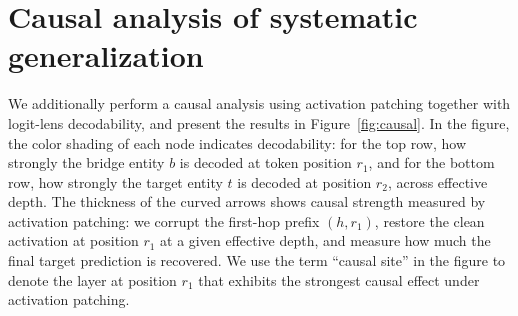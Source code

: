 
\section{Causal analysis of systematic generalization}
\label{app:causal}

We additionally perform a causal analysis using activation patching together with logit-lens decodability, and present the results in Figure~\ref{fig:causal}. In the figure, the color shading of each node indicates decodability: for the top row, how strongly the bridge entity $b$ is decoded at token position $r_1$, and for the bottom row, how strongly the target entity $t$ is decoded at position $r_2$, across effective depth. The thickness of the curved arrows shows causal strength measured by activation patching: we corrupt the first-hop prefix $(h, r_1)$, restore the clean activation at position $r_1$ at a given effective depth, and measure how much the final target prediction is recovered. We use the term “causal site” in the figure to denote the layer at position $r_1$ that exhibits the strongest causal effect under activation patching.

